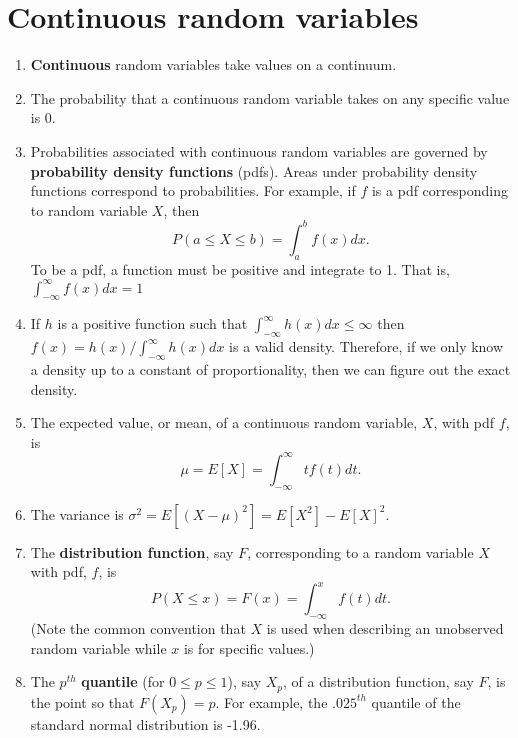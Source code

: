 \documentclass[12pt]{article}
\begin{document}
\section{Continuous random variables}
\begin{enumerate}[1.]
\item {\bf Continuous} random variables take values on a continuum. 
\item The probability that a continuous random variable takes on any specific
  value is 0.
\item Probabilities associated with continuous random variables are governed by
  {\bf probability density functions} (pdfs). Areas under probability density
  functions correspond to probabilities. For example, if $f$ is a pdf corresponding
  to random variable $X$, then
  $$
  P(a \leq X \leq b) = \int_a^b f(x)dx.
  $$
  To be a pdf, a function must be positive and integrate to 1. 
  That is, $\int_{-\infty}^{\infty} f(x)dx = 1$
\item If $h$ is a positive function such that $\int_{-\infty}^{\infty}
  h(x)dx \leq \infty$ then $f(x) = h(x) / \int_{-\infty}^{\infty}
  h(x)dx$ is a valid density. Therefore, if we only know a density up to a constant
  of proportionality, then we can figure out the exact density.
\item The expected value, or mean, of a continuous random variable,
  $X$, with pdf $f$, is
  $$
  \mu = E[X] = \int_{-\infty}^{\infty} t f(t) dt.
  $$
\item The variance is $\sigma^2 = E[(X - \mu)^2] = E[X^2]-E[X]^2$.
\item The {\bf distribution function}, say $F$, corresponding to a random variable $X$ with
  pdf, $f$, is 
  $$
  P(X \leq x) = F(x) = \int_{-\infty}^x f(t)dt.
  $$
  (Note the common convention that $X$ is used when describing an unobserved random variable
  while $x$ is for specific values.)
\item The $p^{th}$ {\bf quantile} (for $0\leq p \leq 1$), say $X_p$,
  of a distribution function, say $F$, is the point so that $F(X_p) =
  p$. For example, the $.025^{th}$ quantile of the standard normal
  distribution is -1.96.
\end{enumerate}
\end{document}
